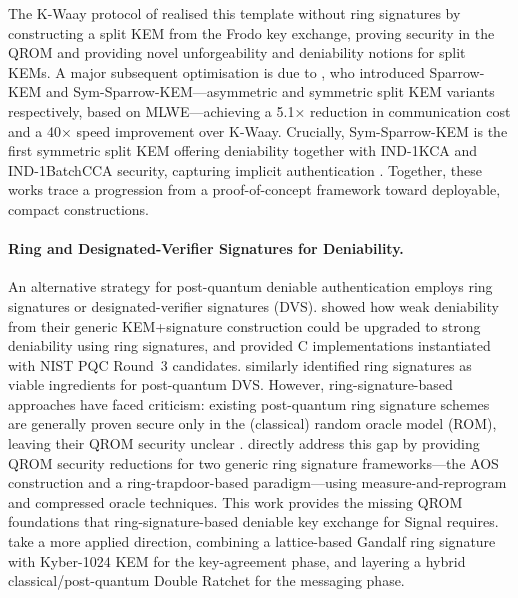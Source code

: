 The K-Waay protocol of \textcite{collins2024b} realised this template without ring signatures by constructing a split KEM from the Frodo key exchange, proving security in the QROM and providing novel unforgeability and deniability notions for split KEMs. A major subsequent optimisation is due to \textcite{niot2025}, who introduced Sparrow-KEM and Sym-Sparrow-KEM—asymmetric and symmetric split KEM variants respectively, based on MLWE—achieving a 5.1× reduction in communication cost and a 40× speed improvement over K-Waay. Crucially, Sym-Sparrow-KEM is the first symmetric split KEM offering deniability together with IND-1KCA and IND-1BatchCCA security, capturing implicit authentication \parencite{niot2025}. Together, these works trace a progression from a proof-of-concept framework toward deployable, compact constructions.

\paragraph{Ring and Designated-Verifier Signatures for Deniability.}
An alternative strategy for post-quantum deniable authentication employs ring signatures or designated-verifier signatures (DVS). \textcite{hashimoto2021,hashimoto2022} showed how weak deniability from their generic KEM+signature construction could be upgraded to strong deniability using ring signatures, and provided C implementations instantiated with NIST PQC Round~3 candidates. \textcite{brendel2022} similarly identified ring signatures as viable ingredients for post-quantum DVS. However, ring-signature-based approaches have faced criticism: existing post-quantum ring signature schemes are generally proven secure only in the (classical) random oracle model (ROM), leaving their QROM security unclear \parencite{collins2024b}. \textcite{beckmann2026} directly address this gap by providing QROM security reductions for two generic ring signature frameworks—the AOS construction and a ring-trapdoor-based paradigm—using measure-and-reprogram and compressed oracle techniques. This work provides the missing QROM foundations that ring-signature-based deniable key exchange for Signal requires. \textcite{guo2025} take a more applied direction, combining a lattice-based Gandalf ring signature with Kyber-1024 KEM for the key-agreement phase, and layering a hybrid classical/post-quantum Double Ratchet for the messaging phase.

